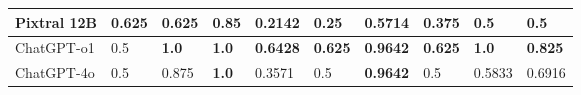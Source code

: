 \begin{table*}[]
\begin{tabular}{|l|l|l|l|l|l|l|l|l|l|}
Pixtral 12B                                                             & \textbf{0.625}                                                           & 0.625             & 0.85                                                                      & 0.2142                                                                  & 0.25                                                                         & 0.5714                                                                  & 0.375             & 0.5                                                                  & 0.5            \\ \hline
ChatGPT-o1                                                              & 0.5                                                                      & \textbf{1.0}      & \textbf{1.0}                                                              & \textbf{0.6428}                                                         & \textbf{0.625}                                                               & \textbf{0.9642}                                                         & \textbf{0.625}    & \textbf{1.0}                                                         & \textbf{0.825} \\ \hline
ChatGPT-4o                                                              & 0.5                                                                      & 0.875             & \textbf{1.0}                                                              & 0.3571                                                                  & 0.5                                                                          & \textbf{0.9642}                                                         & 0.5               & 0.5833                                                               & 0.6916         \\ \hline
\end{tabular}

\label{tab:accuracy_score}

\end{table*}


